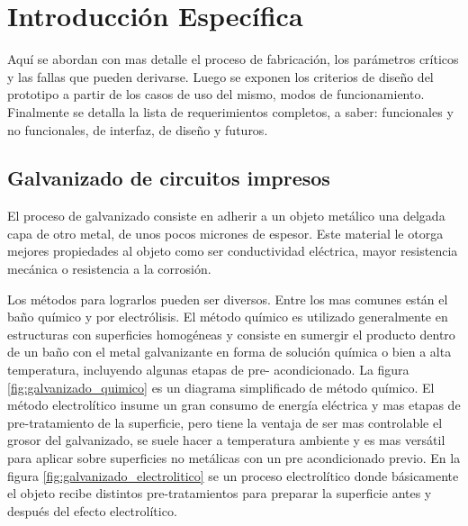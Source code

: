 \chapter{ Introducción Específica } %
Aquí se abordan con mas detalle el proceso de fabricación, los parámetros críticos y las fallas que pueden derivarse. Luego se exponen los criterios de diseño del prototipo a partir de los casos de uso del mismo, modos de funcionamiento. Finalmente se detalla la lista de requerimientos completos, a saber: funcionales y no funcionales, de interfaz, de diseño y futuros.

\section{ Galvanizado de circuitos impresos }

El proceso de galvanizado consiste en adherir a un objeto metálico una delgada capa de otro metal, de unos pocos micrones de espesor. Este material le otorga mejores propiedades al objeto como ser conductividad eléctrica, mayor resistencia mecánica o resistencia a la corrosión. 

Los métodos para lograrlos pueden ser diversos. Entre los mas comunes están el baño químico y por electrólisis. El método químico es utilizado generalmente en estructuras con superficies homogéneas y consiste en sumergir el producto dentro de un baño con el metal galvanizante en forma de solución química o bien a alta temperatura, incluyendo algunas etapas de pre- acondicionado. La figura \ref{fig:galvanizado_quimico} es un diagrama simplificado de método químico.
El método electrolítico insume un gran consumo de energía eléctrica y mas etapas de pre-tratamiento de la superficie, pero tiene la ventaja de ser mas controlable el grosor del galvanizado, se suele hacer a temperatura ambiente y es mas versátil para aplicar sobre superficies no metálicas con un pre acondicionado previo. En la figura \ref{fig:galvanizado_electrolitico} se  un proceso electrolítico donde básicamente el objeto recibe distintos pre-tratamientos para preparar la superficie antes y después del efecto electrolítico. 

